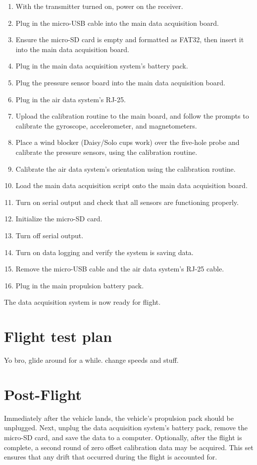 \begin{enumerate}
\item With the transmitter turned on, power on the receiver.
\item Plug in the micro-USB cable into the main data acquisition board.
\item Ensure the micro-SD card is empty and formatted as FAT32, then insert it into the main data acquisition board.
\item Plug in the main data acquisition system's battery pack.
\item Plug the pressure sensor board into the main data acquisition board.
\item Plug in the air data system's RJ-25.
\item Upload the calibration routine to the main board, and follow the prompts to calibrate the gyroscope, accelerometer, and magnetometers.
\item Place a wind blocker (Daisy/Solo cups work) over the five-hole probe and calibrate the pressure sensors, using the calibration routine.
\item Calibrate the air data system's orientation using the calibration routine.
\item Load the main data acquisition script onto the main data acquisition board.
\item Turn on serial output and check that all sensors are functioning properly.
\item Initialize the micro-SD card.
\item Turn off serial output.
\item Turn on data logging and verify the system is saving data.
\item Remove the micro-USB cable and the air data system's RJ-25 cable.
\item Plug in the main propulsion battery pack.
\end{enumerate}
The data acquisition system is now ready for flight.

\section{Flight test plan}
Yo bro, glide around for a while. change speeds and stuff.

\section{Post-Flight}
Immediately after the vehicle lands, the vehicle's propulsion pack should be unplugged. Next, unplug the data acquisition system's battery pack, remove the micro-SD card, and save the data to a computer. Optionally, after the flight is complete, a second round of zero offset calibration data may be acquired. This set ensures that any drift that occurred during the flight is accounted for.

